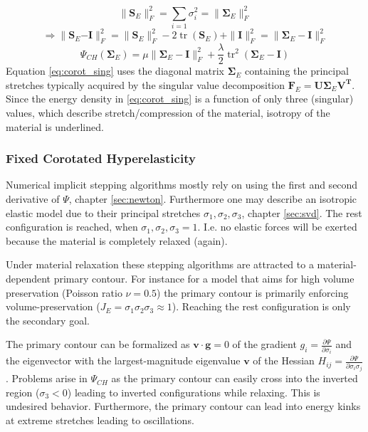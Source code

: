 \documentclass[m,times]{cgMA}
\begin{document}
$$\| \boldsymbol{S}_E \| _ { F }^2 = \sum _ { i = 1 } \sigma _ { i } ^ { 2 } = \| \boldsymbol{\Sigma}_E\|_{F}^2$$
$$\Rightarrow \| \boldsymbol{S}_E\boldsymbol{-I} \| _ { F }^2 = \|\boldsymbol{S}_E \| _ { F }^2 - 2 \operatorname{tr}(\boldsymbol{S}_E)  + \|\boldsymbol{I}\|_{F}^2 = \| \boldsymbol { \Sigma }_E - \boldsymbol { I } \| _ { F } ^ { 2 }$$
\begin{equation} \label{eq:corot_sing}
  \Psi_{CH}(\boldsymbol{\Sigma}_E) = \mu \| \boldsymbol { \Sigma }_E - \boldsymbol { I } \| _ { F } ^ { 2 } + \frac { \lambda } { 2 } \operatorname { tr } ^ { 2 } ( \boldsymbol { \Sigma }_E - \boldsymbol { I } )
\end{equation}
Equation \ref{eq:corot_sing} uses the diagonal matrix $\boldsymbol{\Sigma}_E$ containing the principal stretches typically acquired by the singular value decomposition $\boldsymbol{F}_E \boldsymbol{= U \Sigma}_E\boldsymbol{ V ^T }.$ Since the energy density in \ref{eq:corot_sing} is a function of only three (singular) values, which describe stretch/compression of the material, isotropy of the material is underlined.
\begin{flushright}\cite{ADAMS:ELASTICITY}\end{flushright}
\subsubsection{Fixed Corotated Hyperelasticity}
Numerical implicit stepping algorithms mostly rely on using the first and second derivative of $\Psi$, chapter \ref{sec:newton}. Furthermore one may describe an isotropic elastic model due to their principal stretches $\sigma_1,\sigma_2,\sigma_3$, chapter \ref{sec:svd}. The rest configuration is reached, when $\sigma_1,\sigma_2,\sigma_3 = 1$. I.e. no elastic forces will be exerted because the material is completely relaxed (again).

Under material relaxation these stepping algorithms are attracted to a material-dependent primary contour. For instance for a model that aims for high volume preservation (Poisson ratio $\nu =0.5$) the primary contour is primarily enforcing volume-preservation ($ J_E = \sigma_1\sigma_2\sigma_3 \approx 1$). Reaching the rest configuration is only the secondary goal.

The primary contour can be formalized as $\boldsymbol{v}\cdot \boldsymbol{g} = 0$ of the gradient $g_i = \frac{\partial \Psi}{\partial \sigma_i}$ and the eigenvector with the largest-magnitude eigenvalue $\boldsymbol{v}$ of the Hessian $H_{ij} = \frac{\partial \Psi}{\partial \sigma_i \sigma_j}$. Problems arise in $\Psi_{CH}$ as the primary contour can easily cross into the inverted region ($\sigma_3 < 0$) leading to inverted configurations while relaxing. This is undesired behavior. Furthermore, the primary contour can lead into energy kinks at extreme stretches leading to oscillations.
\end{document}
